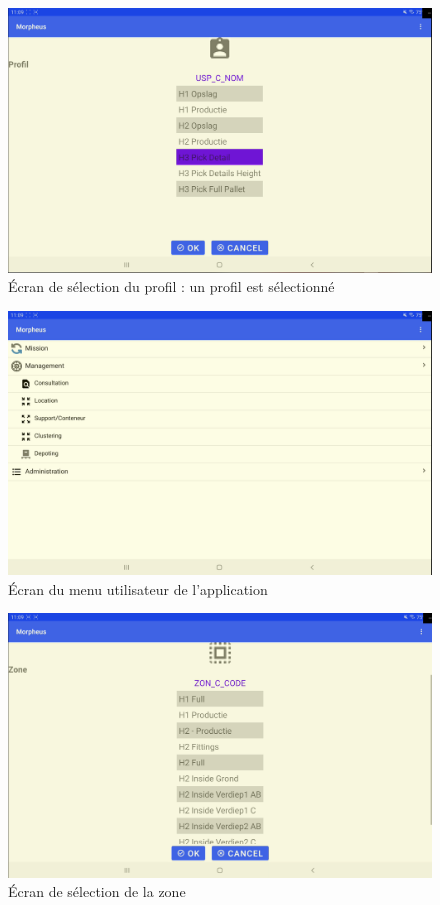 \documentclass[a4paper, 12pt, french]{article}
\begin{document}
			\vfill

			\begin{figure}[h!]
				\begin{center}
					\includegraphics[width=0.7\linewidth]{application/profile_selected.PNG}
				\end{center}
				\caption{Écran de sélection du profil : un profil est sélectionné}
				\label{fig:applications:profile_selected}
			\end{figure}	

		\newpage

			\begin{figure}[h!]
				\begin{center}
					\includegraphics[width=0.7\linewidth]{application/user_menu_other_tab.PNG}
				\end{center}
				\caption{Écran du menu utilisateur de l'application}
				\label{fig:applications:user_menu_other_tab}
			\end{figure}	

			\vfill

			\begin{figure}[h!]
				\begin{center}
					\includegraphics[width=0.7\linewidth]{application/zone.PNG}
				\end{center}
				\caption{Écran de sélection de la zone}
				\label{fig:applications:zone}
			\end{figure}	
\end{document}
